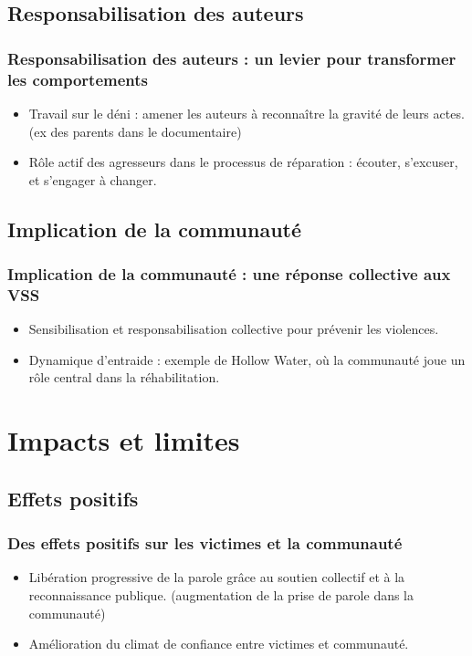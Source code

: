\documentclass[french]{beamer}
\begin{document}
\subsection{Responsabilisation des auteurs}
\begin{frame}
  \frametitle{Responsabilisation des auteurs : un levier pour transformer les comportements}
  \begin{itemize}
    \item Travail sur le déni : amener les auteurs à reconnaître la gravité de leurs actes. (ex des parents dans le documentaire)
    \item Rôle actif des agresseurs dans le processus de réparation : écouter, s’excuser, et s’engager à changer.
  \end{itemize}
\end{frame}

\subsection{Implication de la communauté}
\begin{frame}
  \frametitle{Implication de la communauté : une réponse collective aux VSS}
  \begin{itemize}
    \item Sensibilisation et responsabilisation collective pour prévenir les violences.
    \item Dynamique d’entraide : exemple de Hollow Water, où la communauté joue un rôle central dans la réhabilitation.
  \end{itemize}
\end{frame}

\section{Impacts et limites}
\subsection{Effets positifs}
\begin{frame}
  \frametitle{Des effets positifs sur les victimes et la communauté}
  \begin{itemize}
    \item Libération progressive de la parole grâce au soutien collectif et à la reconnaissance publique. (augmentation de la prise de parole dans la communauté)
    \item Amélioration du climat de confiance entre victimes et communauté.
  \end{itemize}
\end{frame}
\end{document}
